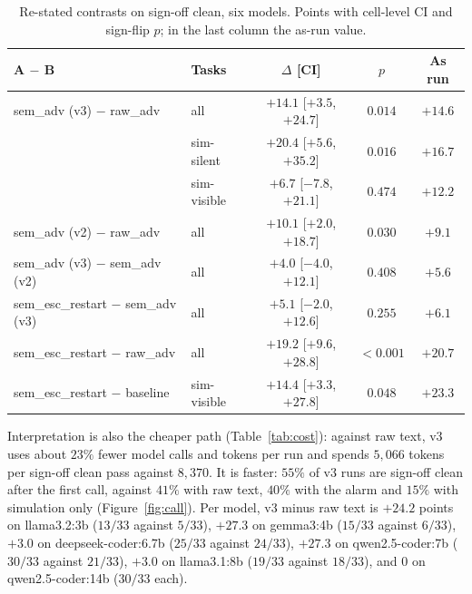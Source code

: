 \documentclass[11pt]{article}
\begin{document}
\begin{table}[htbp]
\centering
\caption{Re-stated contrasts on sign-off clean, six models. Points with
cell-level CI and sign-flip $p$; in the last column the as-run value.}
\label{tab:contrasts}
\small
\begin{tabular}{@{}l l c c c@{}}
\toprule
\textbf{A $-$ B} & \textbf{Tasks} & \textbf{$\Delta$ [CI]} & \textbf{$p$} & \textbf{As run} \\
\midrule
sem\_adv (v3) $-$ raw\_adv          & all        & $+14.1$ [$+3.5$, $+24.7$]  & $0.014$     & $+14.6$ \\
                                    & sim-silent & $+20.4$ [$+5.6$, $+35.2$]  & $0.016$     & $+16.7$ \\
                                    & sim-visible & $+6.7$ [$-7.8$, $+21.1$]  & $0.474$     & $+12.2$ \\
sem\_adv (v2) $-$ raw\_adv          & all        & $+10.1$ [$+2.0$, $+18.7$]  & $0.030$     & $+9.1$ \\
sem\_adv (v3) $-$ sem\_adv (v2)     & all        & $+4.0$ [$-4.0$, $+12.1$]   & $0.408$     & $+5.6$ \\
sem\_esc\_restart $-$ sem\_adv (v3) & all        & $+5.1$ [$-2.0$, $+12.6$]   & $0.255$     & $+6.1$ \\
sem\_esc\_restart $-$ raw\_adv      & all        & $+19.2$ [$+9.6$, $+28.8$]  & ${<}0.001$  & $+20.7$ \\
sem\_esc\_restart $-$ baseline      & sim-visible & $+14.4$ [$+3.3$, $+27.8$] & $0.048$     & $+23.3$ \\
\bottomrule
\end{tabular}
\end{table}

Interpretation is also the cheaper path (Table~\ref{tab:cost}): against raw
text, v3 uses about $23\%$ fewer model calls and tokens per run and spends
$5{,}066$ tokens per sign-off clean pass against $8{,}370$. It is faster:
$55\%$ of v3 runs are sign-off clean after the first call, against $41\%$ with
raw text, $40\%$ with the alarm and $15\%$ with simulation only
(Figure~\ref{fig:call}). Per model, v3 minus raw text is $+24.2$ points on
llama3.2:3b ($13/33$ against $5/33$), $+27.3$ on gemma3:4b ($15/33$ against
$6/33$), $+3.0$ on deepseek-coder:6.7b ($25/33$ against $24/33$), $+27.3$ on
qwen2.5-coder:7b ($30/33$ against $21/33$), $+3.0$ on llama3.1:8b ($19/33$
against $18/33$), and $0$ on qwen2.5-coder:14b ($30/33$ each).
\end{document}

